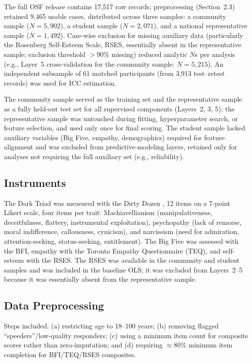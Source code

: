 \documentclass[11pt,twocolumn]{article}
\begin{document}
The full OSF release contains 17,517 raw records; preprocessing (Section~2.3) retained 9,465 usable cases, distributed across three samples: a community sample ($N = 5{,}902$), a student sample ($N = 2{,}071$), and a national representative sample ($N = 1{,}492$). Case-wise exclusion for missing auxiliary data (particularly the Rosenberg Self-Esteem Scale, RSES, essentially absent in the representative sample; exclusion threshold $>90\%$ missing) reduced analytic $N$s per analysis (e.g., Layer~5 cross-validation for the community sample: $N = 5{,}215$). An independent subsample of 61 matched participants (from 3,913 test--retest records) was used for ICC estimation.

The community sample served as the training set and the representative sample as a fully held-out test set for all supervised components (Layers~2, 3, 5); the representative sample was untouched during fitting, hyperparameter search, or feature selection, and used only once for final scoring. The student sample lacked auxiliary variables (Big Five, empathy, demographics) required for feature alignment and was excluded from predictive-modeling layers, retained only for analyses not requiring the full auxiliary set (e.g., reliability).

\subsection{Instruments}

The Dark Triad was measured with the Dirty Dozen \citep{jonason2010}, 12 items on a 7-point Likert scale, four items per trait: Machiavellianism (manipulativeness, deceitfulness, flattery, instrumental exploitation), psychopathy (lack of remorse, moral indifference, callousness, cynicism), and narcissism (need for admiration, attention-seeking, status-seeking, entitlement). The Big Five was assessed with the BFI, empathy with the Toronto Empathy Questionnaire (TEQ), and self-esteem with the RSES. The RSES was available in the community and student samples and was included in the baseline OLS; it was excluded from Layers~2--5 because it was essentially absent from the representative sample.

\subsection{Data Preprocessing}

Steps included: (a) restricting age to 18--100 years; (b) removing flagged ``speeders''/low-quality responders; (c) using a minimum item count for composite scores rather than zero-imputation; and (d) requiring $\approx 80\%$ minimum item completion for BFI/TEQ/RSES composites.
\end{document}
